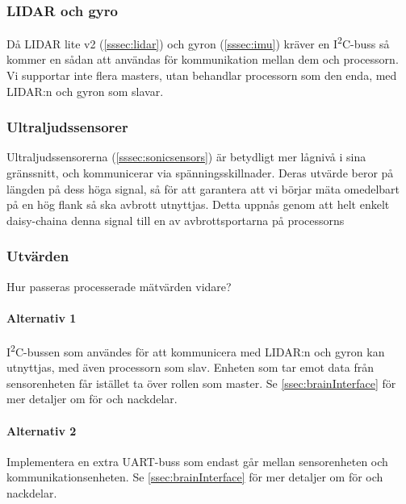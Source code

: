 \documentclass[a4paper,11pt]{article}
\begin{document}
\subsubsection{LIDAR och gyro}
Då LIDAR lite v2 (\ref{sssec:lidar}) och gyron (\ref{sssec:imu}) kräver en I\textsuperscript{2}C-buss så kommer en sådan att användas för kommunikation mellan dem och processorn. Vi supportar inte flera masters, utan behandlar processorn som den enda, med LIDAR:n och gyron som slavar.

\subsubsection{Ultraljudssensorer}
Ultraljudssensorerna (\ref{sssec:sonicsensors}) är betydligt mer lågnivå i sina gränssnitt, och kommunicerar via spänningsskillnader. Deras utvärde beror på längden på dess höga signal, så för att garantera att vi börjar mäta omedelbart på en hög flank så ska avbrott utnyttjas. Detta uppnås genom att helt enkelt daisy-chaina denna signal till en av avbrottsportarna på processorns

\subsubsection{Utvärden}
Hur passeras processerade mätvärden vidare?

\paragraph{Alternativ 1}
I\textsuperscript{2}C-bussen som användes för att kommunicera med LIDAR:n och gyron kan utnyttjas, med även processorn som slav. Enheten som tar emot data från sensorenheten får istället ta över rollen som master. Se \ref{ssec:brainInterface} för mer detaljer om för och nackdelar.

\paragraph{Alternativ 2}
Implementera en extra UART-buss som endast går mellan sensorenheten och kommunikationsenheten. Se \ref{ssec:brainInterface} för mer detaljer om för och nackdelar.

\newpage
\end{document}
